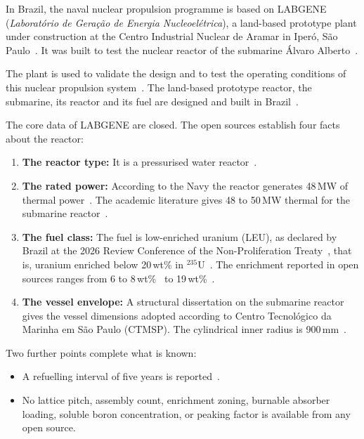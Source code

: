 In Brazil, the naval nuclear propulsion programme is based on LABGENE
(\emph{Laboratório de Geração de Energia Nucleoelétrica}), a
land-based prototype plant under construction at the Centro Industrial
Nuclear de Aramar in Iperó, São Paulo~\cite{ctmsp_visita_2018}. It
was built to test the nuclear reactor of the submarine Álvaro
Alberto~\cite{vasconcelos_fapesp_2025}.

The plant is used to validate the design and to test the
operating conditions of this nuclear propulsion
system~\cite{ctmsp_labgene_2015}. The land-based prototype reactor, the
submarine, its reactor and its fuel are designed and built in
Brazil~\cite{brazil_npt_wp13_2026}.

The core data of LABGENE are closed. The open sources establish four facts
about the reactor:

\begin{enumerate}
  \item \textbf{The reactor type:} It is a pressurised water
        reactor~\cite{ctmsp_labgene_2015}.

  \item \textbf{The rated power:} According to the Navy the reactor
        generates 48\,MW of thermal power~\cite{demartini_nuclep_2022}.
        The academic literature gives 48 to 50\,MW thermal for the
        submarine reactor~\cite{dinizcosta_2017}.

  \item \textbf{The fuel class:} The fuel is low-enriched uranium (LEU),
        as declared by Brazil at the 2026 Review Conference of the
        Non-Proliferation Treaty~\cite{brazil_npt_wp13_2026}, that is,
        uranium enriched below 20\,wt\% in
        $^{235}$U~\cite{nrc_10cfr110_2}. The enrichment reported in open
        sources ranges from 6 to 8\,wt\%~\cite{dinizcosta_2017} to
        19\,wt\%~\cite{vasconcelos_fapesp_2025}.

  \item \textbf{The vessel envelope:} A structural dissertation on the
        submarine reactor gives the vessel dimensions
        adopted according to Centro Tecnológico da Marinha em São Paulo (CTMSP). The cylindrical inner radius is
        900\,mm~\cite{maruyama_2013}.
\end{enumerate}

Two further points complete what is known:

\begin{itemize}
  \item A refuelling interval of five years is reported~\cite{dinizcosta_2017}.

  \item No lattice pitch, assembly count, enrichment zoning, burnable
        absorber loading, soluble boron concentration, or peaking factor
        is available from any open source.
\end{itemize}

